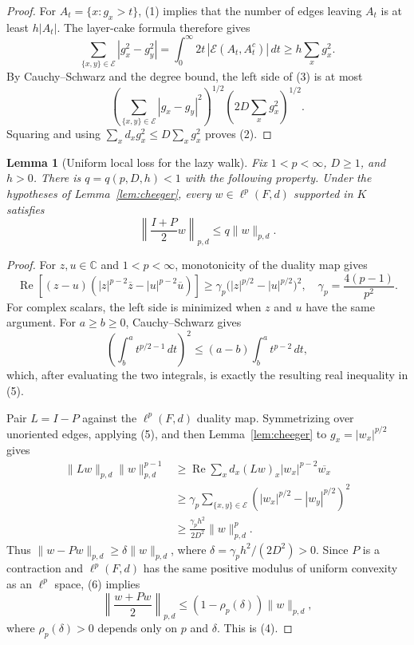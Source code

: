 \documentclass[11pt]{article}
\newtheorem{lemma}[theorem]{Lemma}
\begin{document}
\begin{proof}
For $A_t=\{x:g_x>t\}$, (1) implies that the number of edges leaving $A_t$ is
at least $h|A_t|$. The layer-cake formula therefore gives
\[
 \sum_{\{x,y\}\in\mathcal E}|g_x^2-g_y^2|
 =\int_0^\infty 2t\,|\mathcal E(A_t,A_t^c)|\,dt
 \ge h\sum_x g_x^2.
 \tag{3}
\]
By Cauchy--Schwarz and the degree bound, the left side of (3) is at most
\[
 \left(\sum_{\{x,y\}\in\mathcal E}|g_x-g_y|^2\right)^{1/2}
 \left(2D\sum_xg_x^2\right)^{1/2}.
\]
Squaring and using $\sum_xd_xg_x^2\le D\sum_xg_x^2$ proves (2).
\end{proof}

\begin{lemma}[Uniform local loss for the lazy walk]\label{lem:lazy}
Fix $1<p<\infty$, $D\ge1$, and $h>0$. There is $q=q(p,D,h)<1$ with the
following property. Under the hypotheses of Lemma~\ref{lem:cheeger}, every
$w\in\ell^p(F,d)$ supported in $K$ satisfies
\[
 \left\|\frac{I+P}{2}w\right\|_{p,d}\le q\|w\|_{p,d}.
 \tag{4}
\]
\end{lemma}

\begin{proof}
For $z,u\in\mathbb C$ and $1<p<\infty$, monotonicity of the duality map gives
\[
 \operatorname{Re}\!\left[(z-u)
 (|z|^{p-2}\overline z-|u|^{p-2}\overline u)\right]
 \ge \gamma_p\bigl(|z|^{p/2}-|u|^{p/2}\bigr)^2,
 \quad \gamma_p=\frac{4(p-1)}{p^2}.
 \tag{5}
\]
For complex scalars, the left side is minimized when $z$ and $u$ have the
same argument.  For $a\ge b\ge0$, Cauchy--Schwarz gives
\[
 \left(\int_b^a t^{p/2-1}\,dt\right)^2
 \le (a-b)\int_b^a t^{p-2}\,dt,
\]
which, after evaluating the two integrals, is exactly the resulting real
inequality in (5).

Pair $L=I-P$ against the $\ell^p(F,d)$ duality map. Symmetrizing over
unoriented edges, applying (5), and then Lemma~\ref{lem:cheeger} to
$g_x=|w_x|^{p/2}$ gives
\[
 \begin{split}
 \|Lw\|_{p,d}\|w\|_{p,d}^{p-1}
 &\ge \operatorname{Re}\sum_xd_x(Lw)_x|w_x|^{p-2}\overline{w_x}\\
 &\ge \gamma_p\sum_{\{x,y\}\in\mathcal E}
       (|w_x|^{p/2}-|w_y|^{p/2})^2\\
 &\ge \frac{\gamma_ph^2}{2D^2}\|w\|_{p,d}^p.
 \end{split}
 \tag{6}
\]
Thus $\|w-Pw\|_{p,d}\ge\delta\|w\|_{p,d}$, where
$\delta=\gamma_ph^2/(2D^2)>0$. Since $P$ is a contraction and
$\ell^p(F,d)$ has the same positive modulus of uniform convexity as an
$\ell^p$ space, (6) implies
\[
 \left\|\frac{w+Pw}{2}\right\|_{p,d}
 \le (1-\rho_p(\delta))\|w\|_{p,d},
\]
where $\rho_p(\delta)>0$ depends only on $p$ and $\delta$. This is (4).
\end{proof}
\end{document}
